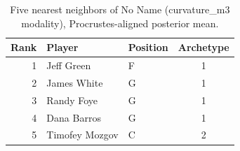 \begin{table}[htbp]
  \centering\small
  \begin{tabular}{rllc}
    \toprule
    Rank & Player & Position & Archetype \\
    \midrule
    1 & Jeff Green & F & 1 \\
    2 & James White & G & 1 \\
    3 & Randy Foye & G & 1 \\
    4 & Dana Barros & G & 1 \\
    5 & Timofey Mozgov & C & 2 \\
    \bottomrule
  \end{tabular}
  \caption{Five nearest neighbors of No Name (curvature_m3 modality), Procrustes-aligned posterior mean.}
  \label{tab:No_Name_neighbors_curvature_m3}
\end{table}

